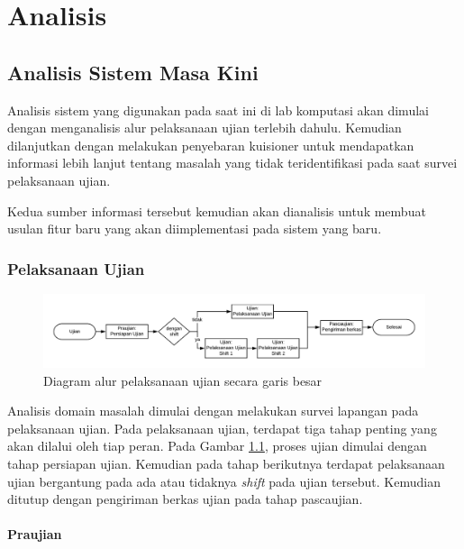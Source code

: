 \chapter{Analisis}
\label{chap:analisis}

\section{Analisis Sistem Masa Kini}
    Analisis sistem yang digunakan pada saat ini di lab komputasi akan dimulai
    dengan menganalisis alur pelaksanaan ujian terlebih dahulu. Kemudian
    dilanjutkan dengan melakukan penyebaran kuisioner untuk mendapatkan
    informasi lebih lanjut tentang masalah yang tidak teridentifikasi pada saat
    survei pelaksanaan ujian.
    
    Kedua sumber informasi tersebut kemudian akan dianalisis untuk membuat
    usulan fitur baru yang akan diimplementasi pada sistem yang baru.

\subsection{Pelaksanaan Ujian}

    \begin{figure}[H]
        \centering
        \includegraphics[width=0.75\paperwidth]{Gambar/flowchart/exam-flow-ujian.pdf}
        \caption{Diagram alur pelaksanaan ujian secara garis besar}
        \label{fig:flowchart-exam-outline}
    \end{figure}
    
    Analisis domain masalah dimulai dengan melakukan survei lapangan pada
    pelaksanaan ujian. Pada pelaksanaan ujian, terdapat tiga tahap penting yang
    akan dilalui oleh tiap peran. Pada Gambar \ref{fig:flowchart-exam-outline},
    proses ujian dimulai dengan tahap persiapan ujian. Kemudian pada tahap
    berikutnya terdapat pelaksanaan ujian bergantung pada ada atau tidaknya
    \textit{shift} pada ujian tersebut. Kemudian ditutup dengan pengiriman
    berkas ujian pada tahap pascaujian.
    
    \subsubsection{Praujian}
    
